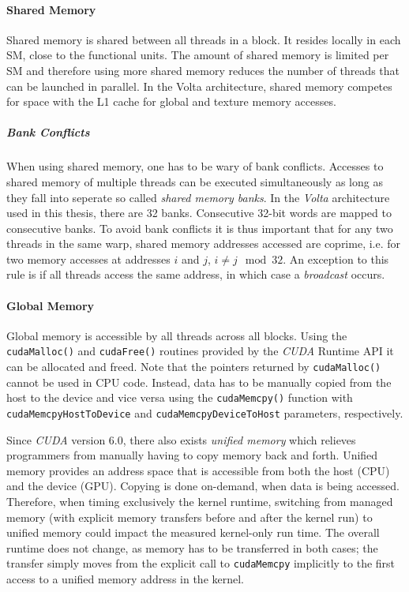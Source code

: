 \paragraph{Shared Memory}
Shared memory is shared between all threads in a block. It resides locally in each SM, close to the functional units. The amount of shared memory is limited per SM and therefore using more shared memory reduces the number of threads that can be launched in parallel. In the Volta architecture, shared memory competes for space with the L1 cache for global and texture memory accesses.

\subparagraph{Bank Conflicts}
When using shared memory, one has to be wary of bank conflicts. Accesses to shared memory of multiple threads can be executed simultaneously as long as they fall into seperate so called \emph{shared memory banks}. In the \emph{Volta} architecture used in this thesis, there are 32 banks. Consecutive 32-bit words are mapped to consecutive banks. To avoid bank conflicts it is thus important that for any two threads in the same warp, shared memory addresses accessed are coprime, i.e. for two memory accesses at addresses $i$ and $j$, $i \neq j \mod 32$. An exception to this rule is if all threads access the same address, in which case a \emph{broadcast} occurs.

\paragraph{Global Memory}	\label{sec:unified-memory}
Global memory is accessible by all threads across all blocks. Using the \texttt{cudaMalloc()} and \texttt{cudaFree()} routines provided by the \emph{CUDA} Runtime API it can be allocated and freed. Note that the pointers returned by \texttt{cudaMalloc()} cannot be used in CPU code. Instead, data has to be manually copied from the host to the device and vice versa using the \texttt{cudaMemcpy()} function with \texttt{cudaMemcpyHostToDevice} and \texttt{cudaMemcpyDeviceToHost} parameters, respectively. 

Since \emph{CUDA} version 6.0, there also exists \emph{unified memory} which relieves programmers from manually having to copy memory back and forth. Unified memory provides an address space that is accessible from both the host (CPU) and the device (GPU). Copying is done on-demand, when data is being accessed. Therefore, when timing exclusively the kernel runtime, switching from managed memory (with explicit memory transfers before and after the kernel run) to unified memory could impact the measured kernel-only run time. The overall runtime does not change, as memory has to be transferred in both cases; the transfer simply moves from the explicit call to \texttt{cudaMemcpy} implicitly to the first access to a unified memory address in the kernel.

